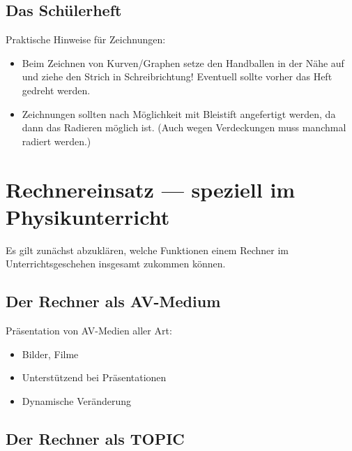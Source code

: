 \subsection{Das Sch\"{u}lerheft}

Praktische Hinweise f\"{u}r Zeichnungen:
\begin{itemize}
\item
Beim Zeichnen von Kurven/Graphen setze den Handballen in der
N\"{a}he auf und ziehe den Strich in Schreibrichtung!
Eventuell sollte vorher das Heft gedreht werden.

\item
Zeichnungen sollten nach M\"{o}glichkeit mit
Bleistift angefertigt werden,
da dann das Radieren m\"{o}glich ist.
(Auch wegen Verdeckungen muss manchmal radiert werden.)
\end{itemize}



\bip\bip
\section{Rechner\-einsatz --- speziell im Physikunterricht}

Es gilt zun\"{a}chst abzukl\"{a}ren, welche Funktionen einem Rechner im Unterrichtsgeschehen insgesamt zukommen k\"{o}nnen.

\subsection{Der Rechner als AV-Medium}

Pr\"{a}sentation von AV-Medien aller Art:
\begin{itemize}
\item Bilder, Filme
\item Unterst\"{u}tzend bei Pr\"{a}sentationen
\item Dynamische Ver\"{a}nderung
\end{itemize}


\subsection{Der Rechner als TOPIC}

